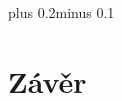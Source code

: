 \documentclass[11pt,twoside,a4paper]{book}
\begin{document}

\tableofcontents



\listoffigures



\listoftables



\mainbodystarts
\normalfont
{}\baselineskip plus 0.2\baselineskip minus 0.1\baselineskip





















\chapter{Závěr}

\end{document}

